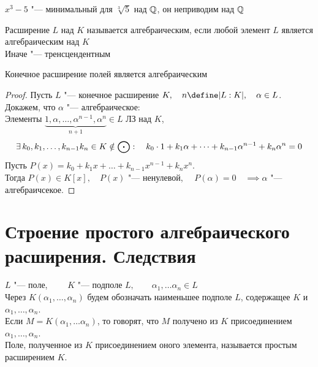 \begin{eg}
	$ x^3 - 5 $ "--- минимальный для $ \sqrt[3]5 $ над $ \mathbb{Q} $, \as он неприводим над $ \mathbb{Q} $
\end{eg}

\begin{definition}
	Расширение $ L $ над $ K $ называется алгебраическим, если любой элемент $ L $ является алгебраическим над $ K $ \\
	Иначе "--- тренсцендентным
\end{definition}

\begin{theorem}
	Конечное расширение полей является алгебраическим
\end{theorem}

\begin{proof}
	Пусть $ L $ "--- конечное расширение $ K, \quad n \define |L : K|, \quad \alpha \in L $. \\
	Докажем, что $ \alpha $ "--- алгебраическое: \\
	Элементы $ \underbrace{1, \alpha, \dots, \alpha^{n - 1}, \alpha^n}_{n + 1} \in L $ ЛЗ над $ K $, \ie
	$$ \exists\, k_0, k_1, \dots, k_{n - 1} k_n \in K \notin \bigodot : \quad k_0 \cdot 1 + k_1 \alpha + \dots + k_{n - 1}\alpha^{n - 1} + k_n\alpha^n = 0 $$
	Пусть $ P(x) = k_0 + k_1x + \dots + k_{n - 1}x^{n - 1} + k_nx^n $. \\
	Тогда $ P(x) \in K[x], \quad P(x) $ "--- ненулевой, $ \quad P(\alpha) = 0 \quad \implies \alpha $ "--- алгебраичсекое.
\end{proof}

\section{Строение простого алгебраического расширения. Следствия}

\begin{definition}
	$ L $ "--- поле, $ \qquad K $ "--- подполе $ L, \qquad \alpha_1, \dots \alpha_n \in L $ \\
	Через $ K(\alpha_1, \dots, \alpha_n) $ будем обозначать наименьшее подполе $ L $, содержащее $ K $ и $ \alpha_1, \dots, \alpha_n $. \\
	Если $ M = K(\alpha_1, \dots \alpha_n) $, то говорят, что $ M $ получено из $ K $ присоединением $ \alpha_1, \dots, \alpha_n $. \\
	Поле, полученное из $ K $ присоединением оного элемента, называется простым расширением $ K $.
\end{definition}

